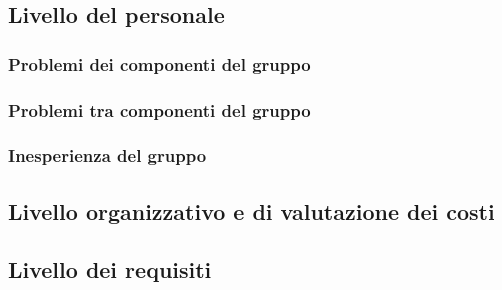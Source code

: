 	\subsection{Livello del personale}
	\subsubsection{Problemi dei componenti del gruppo}
	\subsubsection{Problemi tra componenti del gruppo}
	\subsubsection{Inesperienza del gruppo}
	
	\subsection{Livello organizzativo e di valutazione dei costi}
	\subsection{Livello dei requisiti}
